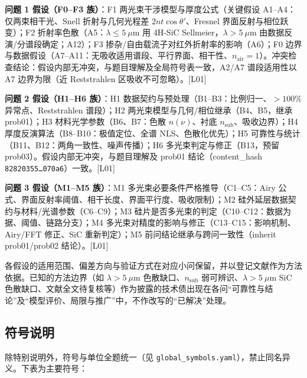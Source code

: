 \textbf{问题 1 假设（F0--F3 族）}：F1 两光束干涉模型与厚度公式（关键假设
A1--A4：仅两束相干光、Snell 折射与几何光程差 \(2nt\cos\theta'\)、Fresnel
界面反射与相位跃变）；F2 折射率色散（A5：\(\lambda\le5\ \mu\mathrm{m}\)
用 4H-SiC Sellmeier，\(\lambda>5\ \mu\mathrm{m}\)
由数据反演/分谱段确定；A12）；F3
掺杂/自由载流子对红外折射率的影响（A6）；F0
边界与数据假设（A7--A11：无吸收适用谱段、平行界面、相干性、\(n_{\mathrm{air}}=1\)）。冲突检查结论：假设内部无冲突，与题目理解及全局符号表一致，A2/A7
谱段适用性以 A7 边界为限（近 Reststrahlen 区吸收不可忽略）。{[}L01{]}

\textbf{问题 2 假设（H1--H6 族）}：H1
数据契约与预处理（B1--B3：比例归一、\(>100\%\) 异常点、Reststrahlen
谱段）；H2 两光束模型与几何/相位继承（B4、B5，继承 prob01）；H3
材料光学参数（B6、B7：色散 \(n(\nu)\)、衬底
\(n_{\mathrm{sub}}\)、吸收边界）；H4
厚度反演算法（B8--B10：极值定位、全谱 NLS、色散化优先）；H5
可靠性与统计（B11、B12：两角一致性、噪声传播）；H6
多光束判定与修正（B13，预留 prob03）。假设内部无冲突，与题目理解及
prob01 结论（content\_hash \texttt{82820355…070a6}）一致。{[}L01{]}

\textbf{问题 3 假设（M1--M5 族）}：M1
多光束必要条件严格推导（C1--C5：Airy
公式、界面反射率阈值、相干长度、界面平行度、吸收限制）；M2
硅外延层数据契约与材料/光谱参数（C6--C9）；M3
硅片是否多光束的判定（C10--C12：数据为据、阈值、链路分支）；M4
多光束对精度的影响与修正（C13--C15：影响机制、Airy/FFT 修正、SiC
重新判定）；M5 前问结论继承与跨问一致性（inherit prob01/prob02
结论）。{[}L01{]}

各假设的适用范围、偏差方向与验证方式在对应小问保留，并以登记文献作为方法依据。已知的方法边界（如
\(\lambda>5\ \mu\mathrm{m}\) 色散缺口、\(n_{\mathrm{sub}}\)
弱可辨识、\(\lambda>5\ \mu\mathrm{m}\) SiC
色散缺口、文献全文待复核等）作为披露的技术债出现在各问``可靠性与结论''及``模型评价、局限与推广''中，不作改写的``已解决''处理。

\subsection{符号说明}\label{ux7b26ux53f7ux8bf4ux660e}

除特别说明外，符号与单位全题统一（见
\texttt{global\_symbols.yaml}），禁止同名异义。下表为主要符号：

